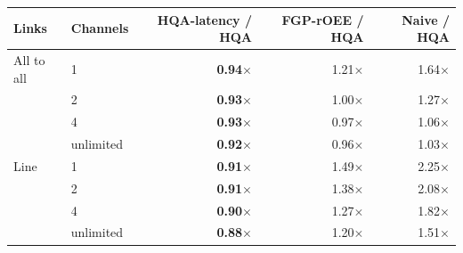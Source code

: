 \begin{tabular}{llrrr}
\toprule
Links & Channels & HQA-latency / HQA & FGP-rOEE / HQA & Naive / HQA \\
\midrule
All to all & 1 & \textbf{0.94$\times$} & 1.21$\times$ & 1.64$\times$ \\
 & 2 & \textbf{0.93$\times$} & 1.00$\times$ & 1.27$\times$ \\
 & 4 & \textbf{0.93$\times$} & 0.97$\times$ & 1.06$\times$ \\
 & unlimited & \textbf{0.92$\times$} & 0.96$\times$ & 1.03$\times$ \\
\midrule
Line & 1 & \textbf{0.91$\times$} & 1.49$\times$ & 2.25$\times$ \\
 & 2 & \textbf{0.91$\times$} & 1.38$\times$ & 2.08$\times$ \\
 & 4 & \textbf{0.90$\times$} & 1.27$\times$ & 1.82$\times$ \\
 & unlimited & \textbf{0.88$\times$} & 1.20$\times$ & 1.51$\times$ \\
\bottomrule
\end{tabular}
